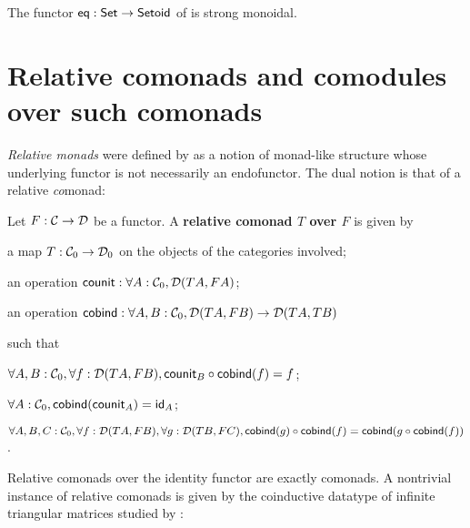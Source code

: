 \documentclass{amsart}
\newcommand{\fat}[1]{\textbf{#1}}
\begin{document}
\begin{example}
  The functor $\eq: \Set \to \Setoid$ of  is strong monoidal.
\end{example}


\section{Relative comonads and comodules over such comonads}\label{sec:comonads}

\emph{Relative monads} were defined by \textcite{DBLP:conf/fossacs/AltenkirchCU10} as a notion of monad-like structure
whose underlying functor is not necessarily an endofunctor.
The dual notion is that of a relative \emph{co}monad:

\begin{definition}\label{def:rel_comonad}
  Let $F:\C\to\D$ be a functor. A \fat{relative comonad $T$ over $F$} is given by
  \begin{packitem}
   \item a map $T:\C_0 \to \D_0$ on the objects of the categories involved;
   \item an operation $\counit : \forall A : \C_0, \D(TA,FA)$;
   \item an operation $\cobind: \forall A,B:\C_0, \D(TA,FB) \to \D(TA,TB)$
  \end{packitem}
  such that 
  \begin{packitem}
   \item $\forall A,B:\C_0, \forall f:\D(TA,FB), \comp{\cobind(f)}{\counit_B} = f$;
   \item $\forall A : \C_0, \cobind(\counit_A) = \id_A$;
   \item $\forall A,B,C:\C_0, \forall f : \D(TA,FB),\forall g:\D(TB,FC), \\
        \comp{\cobind(f)}{\cobind(g)} = \cobind(\comp{\cobind(f)}{g})$.
  \end{packitem} 
\end{definition}

Relative comonads over the identity functor are exactly comonads.
A nontrivial instance of relative comonads is given by the coinductive datatype of infinite triangular matrices
studied by \textcite{DBLP:conf/types/MatthesP11}:
\end{document}

